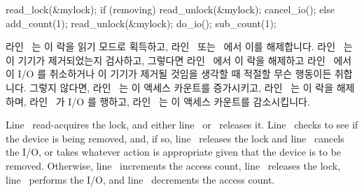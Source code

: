 \begin{fcvlabel}
\begin{VerbatimN}[commandchars=\\\[\]]
read_lock(&mylock);		\lnlbl[acq]
if (removing) {			\lnlbl[check]
	read_unlock(&mylock);	\lnlbl[rel1]
	cancel_io();		\lnlbl[cancel]
} else {
	add_count(1);		\lnlbl[inc]
	read_unlock(&mylock);	\lnlbl[rel2]
	do_io();		\lnlbl[do]
	sub_count(1);		\lnlbl[dec]
}
\end{VerbatimN}
\end{fcvlabel}

\begin{fcvref}
라인~ 는 이 락을 읽기 모드로 획득하고, 라인~
또는~ 에서 이를 해제합니다.
라인~ 는 이 기기가 제거되었는지 검사하고, 그렇다면
라인~ 에서 이 락을 해제하고 라인~ 에서 이 I/O 를
취소하거나 이 기기가 제거될 것임을 생각할 때 적절할 무슨 행동이든 취합니다.
그렇지 않다면, 라인~ 는 이 액세스 카운트를 증가시키고,
라인~ 는 이 락을 해제하며, 라인~ 가 I/O 를 행하고,
라인~ 는 이 액세스 카운트를 감소시킵니다.
\end{fcvref}

\iffalse

\begin{fcvref}
Line~ read-acquires the lock, and either
line~ or~ releases it.
Line~ checks to see if the device is being removed, and, if so,
line~ releases the lock and
line~ cancels the I/O, or takes whatever
action is appropriate given that the device is to be removed.
Otherwise, line~ increments the access count,
line~ releases the
lock, line~ performs the I/O, and
line~ decrements the access count.
\end{fcvref}


